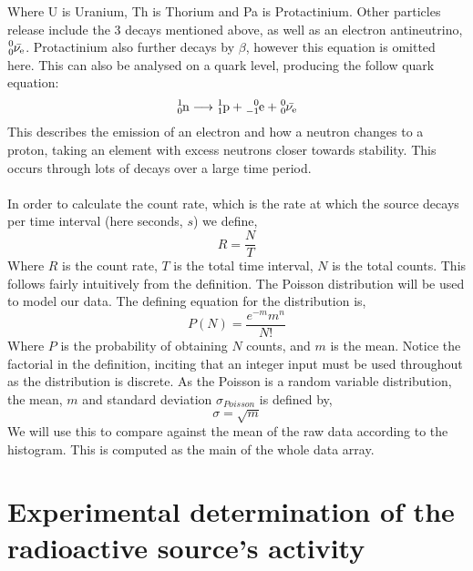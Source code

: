 \documentclass[11pt]{article}
\begin{document}
   Where U is Uranium, Th is Thorium and Pa is Protactinium. Other particles release include the 3 decays mentioned above, as well as an electron antineutrino,$\ce{^{0}_{0}\bar{\nu_{e}}}$. Protactinium also further decays by $\beta$, however this equation is omitted here. This can also be analysed on a quark level, producing the follow quark equation:
 \newline
  \begin{equation} \ce{^{1}_{0}n} \longrightarrow \ce{^{1}_{1}p} + \ce{^{0}_{-1}e} + \ce{^{0}_{0}\bar{\nu_{e}}} 
  \end{equation}
\newline
This describes the emission of an electron and how a neutron changes to a proton, taking an element with excess neutrons closer towards stability. This occurs through lots of decays over a large time period. 
   \\
   \\
   In order to calculate the count rate, which is the rate at which the source decays per time interval (here seconds, $s$)  we define, 
   \begin{equation} R = \frac{N}{T}
   \end{equation}
   Where $R$ is the count rate, $T$ is the total time interval, $N$ is the total counts. This follows fairly intuitively from the definition. 
    The Poisson distribution will be used to model our data. The defining equation for the distribution is, 
    \begin{equation}
        P(N) = \frac{e^{-m}m^{n}}{N!}
    \end{equation}
    Where $P$ is the probability of obtaining $N$ counts, and $m$ is the mean. Notice the factorial in the definition, inciting that an integer input must be used throughout as the distribution is discrete. 
    As the Poisson is a random variable distribution, the mean, $m$ and standard deviation $\sigma_{Poisson}$ is defined by,
    \begin{equation}
        \sigma = \sqrt{m}
    \end{equation}
    We will use this to compare against the mean of the raw data according to the histogram. This is computed as the main of the whole data array. 
     \newline 
    \section{Experimental determination of the radioactive source's activity}
\end{document}

